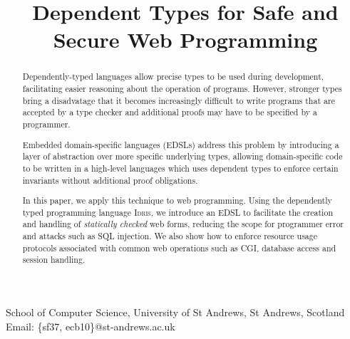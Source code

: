 \documentclass[preprint]{sigplanconf}
\begin{document}
\newcommand{\idris}{\textsc{Idris}}
\newcommand{\idata}{\textsf{iData}}
\newcommand{\itasks}{\textsf{iTasks}}
\newcommand{\Idris}{\textsc{Idris}}
\setlength{\pdfpageheight}{\paperheight}
\setlength{\pdfpagewidth}{\paperwidth}





\titlebanner{}        %
\preprintfooter{}   %

\title{Dependent Types for Safe and Secure Web Programming}

           {School of Computer Science, University of St Andrews, St Andrews, Scotland}
           {Email: \{sf37, ecb10\}@st-andrews.ac.uk}

\maketitle

\begin{abstract}
Dependently-typed languages allow precise types to be used during development,
facilitating easier reasoning about the operation of programs. However,
stronger types bring a disadvatage that it becomes increasingly difficult to
write programs that are accepted by a type checker and additional proofs may
have to be specified by a programmer.

Embedded domain-specific languages (EDSLs) address this problem by introducing
a layer of abstraction over more specific underlying types, allowing
domain-specific code to be written in a high-level languages which uses
dependent types to enforce certain invariants without additional proof
obligations. 

In this paper, we apply this technique to web programming.  Using the
dependently typed programming language \Idris{}, we introduce an EDSL to
facilitate the creation and handling of \emph{statically checked} web forms,
reducing the scope for programmer error and attacks such as SQL injection. We
also show how to enforce resource usage protocols associated with common web
operations such as CGI, database access and session handling.  

\end{abstract}
\end{document}
